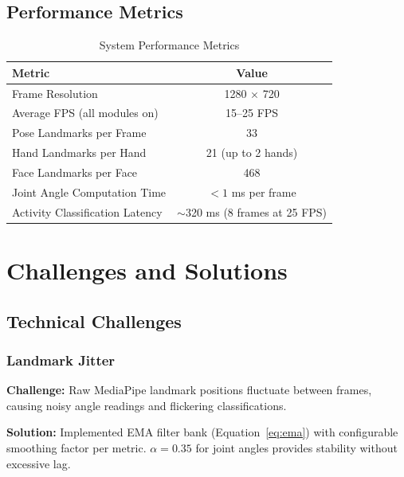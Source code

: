\documentclass[a4paper,12pt]{report}
\begin{document}
\section{Performance Metrics}

\begin{table}[H]
\centering
\begin{tabular}{|l|c|}
\hline
\textbf{Metric} & \textbf{Value} \\
\hline
Frame Resolution & 1280 $\times$ 720 \\
Average FPS (all modules on) & 15--25 FPS \\
Pose Landmarks per Frame & 33 \\
Hand Landmarks per Hand & 21 (up to 2 hands) \\
Face Landmarks per Face & 468 \\
Joint Angle Computation Time & $< 1$ ms per frame \\
Activity Classification Latency & $\sim$320 ms (8 frames at 25 FPS) \\
\hline
\end{tabular}
\caption{System Performance Metrics}
\label{tab:performance}
\end{table}

\newpage

\chapter{Challenges and Solutions}
\thispagestyle{contentpages}
\justifying

\section{Technical Challenges}

\subsection{Landmark Jitter}
\textbf{Challenge:} Raw MediaPipe landmark positions fluctuate between frames, causing noisy angle readings and flickering classifications.

\textbf{Solution:} Implemented EMA filter bank (Equation~\ref{eq:ema}) with configurable smoothing factor per metric. $\alpha = 0.35$ for joint angles provides stability without excessive lag.
\end{document}
